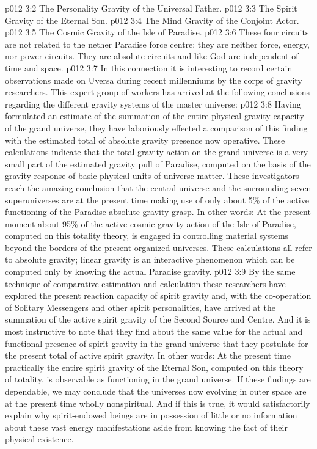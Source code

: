 \vs p012 3:2 \bibnobreakspace The Personality Gravity of the Universal Father.
\vs p012 3:3 \bibnobreakspace The Spirit Gravity of the Eternal Son.
\vs p012 3:4 \bibnobreakspace The Mind Gravity of the Conjoint Actor.
\vs p012 3:5 \bibnobreakspace The Cosmic Gravity of the Isle of Paradise.
\vs p012 3:6 \pc These four circuits are not related to the nether Paradise force centre; they are neither force, energy, nor power circuits. They are absolute  circuits and like God are independent of time and space.
\vs p012 3:7 In this connection it is interesting to record certain observations made on Uversa during recent millenniums by the corps of gravity researchers. This expert group of workers has arrived at the following conclusions regarding the different gravity systems of the master universe:
\vs p012 3:8 \bibnobreakspace {} Having formulated an estimate of the summation of the entire physical\hyp{}gravity capacity of the grand universe, they have laboriously effected a comparison of this finding with the estimated total of absolute gravity presence now operative. These calculations indicate that the total gravity action on the grand universe is a very small part of the estimated gravity pull of Paradise, computed on the basis of the gravity response of basic physical units of universe matter. These investigators reach the amazing conclusion that the central universe and the surrounding seven superuniverses are at the present time making use of only about 5\% of the active functioning of the Paradise absolute\hyp{}gravity grasp. In other words: At the present moment about 95\% of the active cosmic\hyp{}gravity action of the Isle of Paradise, computed on this totality theory, is engaged in controlling material systems beyond the borders of the present organized universes. These calculations all refer to absolute gravity; linear gravity is an interactive phenomenon which can be computed only by knowing the actual Paradise gravity.
\vs p012 3:9 \bibnobreakspace {} By the same technique of comparative estimation and calculation these researchers have explored the present reaction capacity of spirit gravity and, with the co\hyp{}operation of Solitary Messengers and other spirit personalities, have arrived at the summation of the active spirit gravity of the Second Source and Centre. And it is most instructive to note that they find about the same value for the actual and functional presence of spirit gravity in the grand universe that they postulate for the present total of active spirit gravity. In other words: At the present time practically the entire spirit gravity of the Eternal Son, computed on this theory of totality, is observable as functioning in the grand universe. If these findings are dependable, we may conclude that the universes now evolving in outer space are at the present time wholly nonspiritual. And if this is true, it would satisfactorily explain why spirit\hyp{}endowed beings are in possession of little or no information about these vast energy manifestations aside from knowing the fact of their physical existence.
